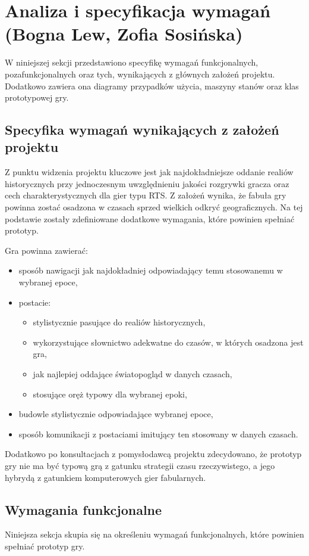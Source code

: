 \section{Analiza i specyfikacja wymagań (Bogna Lew, Zofia Sosińska)}\label{s:wymagania}
W niniejszej sekcji przedstawiono specyfikę wymagań funkcjonalnych, pozafunkcjonalnych oraz tych, wynikających z
głównych założeń projektu. Dodatkowo zawiera ona diagramy przypadków użycia, maszyny stanów oraz klas prototypowej gry.

\subsection{Specyfika wymagań wynikających z założeń projektu}
Z punktu widzenia projektu kluczowe jest jak najdokładniejsze oddanie realiów historycznych przy jednoczesnym
uwzględnieniu jakości rozgrywki gracza oraz cech charakterystycznych dla gier typu RTS. Z założeń wynika, że fabuła
gry powinna zostać osadzona w czasach sprzed wielkich odkryć geograficznych. Na tej podstawie zostały zdefiniowane
dodatkowe wymagania, które powinien spełniać prototyp.

Gra powinna zawierać:
\begin{itemize}
  \item sposób nawigacji jak najdokładniej odpowiadający temu stosowanemu w wybranej epoce,
  \item postacie:
  \begin{itemize}
    \item stylistycznie pasujące do realiów historycznych,
    \item wykorzystujące słownictwo adekwatne do czasów, w których osadzona jest gra,
    \item jak najlepiej oddające światopogląd w danych czasach,
    \item stosujące oręż typowy dla wybranej epoki,
  \end{itemize}
  \item budowle stylistycznie odpowiadające wybranej epoce,
  \item sposób komunikacji z postaciami imitujący ten stosowany w danych czasach.
\end{itemize}

Dodatkowo po konsultacjach z pomysłodawcą projektu zdecydowano, że prototyp gry nie ma być typową grą z gatunku strategii
czasu rzeczywistego, a jego hybrydą z gatunkiem komputerowych gier fabularnych.

\subsection{Wymagania funkcjonalne}\label{ss:fun}
Niniejsza sekcja skupia się na określeniu wymagań funkcjonalnych, które powinien spełniać prototyp gry.

